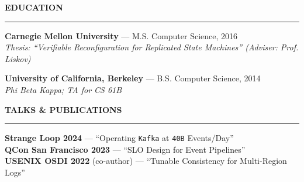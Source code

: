 \documentclass[letterpaper,10pt]{article}
\newcommand{\enghead}[1]{%
  \vspace{12pt}
  {\ttfamily\bfseries\fontsize{9.5}{12}\selectfont\textcolor{engBody}{\MakeUppercase{#1}}}
  \vspace{4pt}
  \noindent\textcolor{engDiv}{\rule{\linewidth}{0.5pt}}
  \vspace{4pt}
}
\newcommand{\m}[1]{\texttt{\small #1}}
\begin{document}
\enghead{Education}

\noindent\textbf{Carnegie Mellon University} --- M.S. Computer Science, 2016 \\
\textit{Thesis: ``Verifiable Reconfiguration for Replicated State Machines'' (Adviser: Prof. Liskov)}

\vspace{4pt}
\noindent\textbf{University of California, Berkeley} --- B.S. Computer Science, 2014 \\
\textit{Phi Beta Kappa; TA for CS 61B}

\enghead{Talks \& Publications}

\noindent\textbf{Strange Loop 2024} --- ``Operating \m{Kafka} at \m{40B} Events/Day'' \\
\textbf{QCon San Francisco 2023} --- ``SLO Design for Event Pipelines'' \\
\textbf{USENIX OSDI 2022} (co-author) --- ``Tunable Consistency for Multi-Region Logs''
\end{document}
